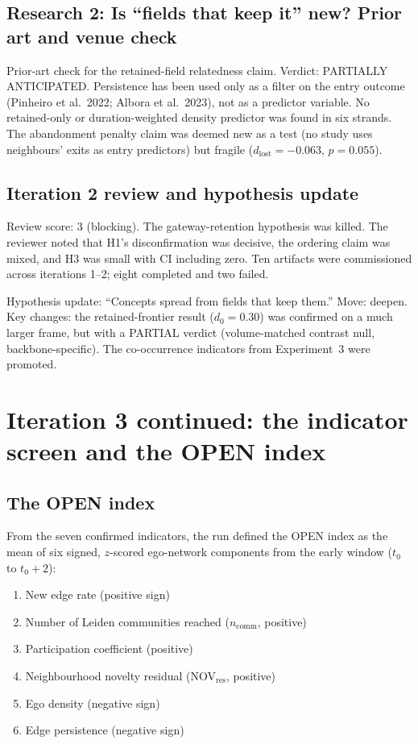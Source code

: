 \documentclass[11pt,letterpaper]{article}
\begin{document}
\subsection{Research 2: Is ``fields that keep it'' new? Prior art and venue check}

Prior-art check for the retained-field relatedness claim. Verdict: PARTIALLY ANTICIPATED. Persistence has been used only as a filter on the entry outcome (Pinheiro et al.\ 2022; Albora et al.\ 2023), not as a predictor variable. No retained-only or duration-weighted density predictor was found in six strands. The abandonment penalty claim was deemed new as a test (no study uses neighbours' exits as entry predictors) but fragile ($d_{\text{lost}} = -0.063$, $p = 0.055$).

\subsection{Iteration 2 review and hypothesis update}

Review score: 3 (blocking). The gateway-retention hypothesis was killed. The reviewer noted that H1's disconfirmation was decisive, the ordering claim was mixed, and H3 was small with CI including zero. Ten artifacts were commissioned across iterations 1--2; eight completed and two failed.

Hypothesis update: ``Concepts spread from fields that keep them.'' Move: deepen. Key changes: the retained-frontier result ($d_0 = 0.30$) was confirmed on a much larger frame, but with a PARTIAL verdict (volume-matched contrast null, backbone-specific). The co-occurrence indicators from Experiment~3 were promoted.

\section{Iteration 3 continued: the indicator screen and the OPEN index}
\label{sec:iter3_open}

\subsection{The OPEN index}

From the seven confirmed indicators, the run defined the OPEN index as the mean of six signed, $z$-scored ego-network components from the early window ($t_0$ to $t_0 + 2$):

\begin{enumerate}
    \item New edge rate (positive sign)
    \item Number of Leiden communities reached ($n_{\text{comm}}$, positive)
    \item Participation coefficient (positive)
    \item Neighbourhood novelty residual (NOV$_{\text{res}}$, positive)
    \item Ego density (negative sign)
    \item Edge persistence (negative sign)
\end{enumerate}
\end{document}
